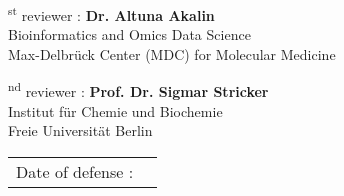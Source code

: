 \begin{supervisorpage}
\textsuperscript{st} reviewer : \textbf{Dr. Altuna Akalin}\\
\hspace*{5.3em} Bioinformatics and Omics Data Science\\
\hspace*{5.3em} Max-Delbrück Center (MDC) for Molecular Medicine

\vspace{20pt} %

\textsuperscript{nd} reviewer : \textbf{Prof. Dr. Sigmar Stricker}\\
\hspace*{5.8em}Institut für Chemie und Biochemie\\
\hspace*{5.8em}Freie Universität Berlin



\vspace{2cm} %
\noindent
\begin{tabular}{rl}
Date of defense : & \\
\end{tabular}

\end{supervisorpage}